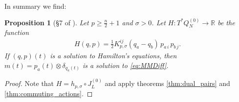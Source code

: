 \documentclass[12pt]{amsart}
\newcommand{\R}{\ensuremath{\mathbb{R}}}
\newtheorem{prop}[thm]{Proposition}
\begin{document}
  In summary we find:
  \begin{prop}[\S7 of \cite{MumfordMichor2013}] \label{prop:0-solutions}
  Let $p \geq \frac{n}{2} +1$ and $\sigma > 0$.
  Let $H:T^*Q_N^{(0)} \to \R$ be the function
  \begin{align*}
    H(q,p) =\frac{1}{2} K_{p,\sigma}^{ij}(q_a - q_b)\, p_{a\,i}\, p_{b\,j}.
  \end{align*}
  If $(q,p)(t)$ is a solution to Hamilton's equations, then
  $m(t) = p_a(t) \otimes \delta_{q_a(t)}$
  is a solution to \eqref{eq:MMDiff}.
\end{prop}
\begin{proof}
	Note that $H = h_{p,\sigma} \circ J_L^{(0)}$ and apply theorems \ref{thm:dual_pairs} and  \ref{thm:commuting_actions}.
\end{proof}
\end{document}
